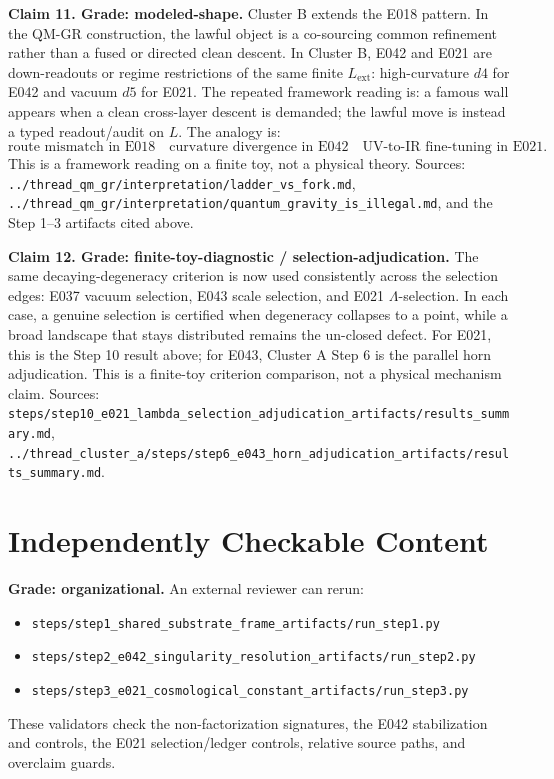 \documentclass[11pt]{article}
\begin{document}
\textbf{Claim 11. Grade: modeled-shape.}
Cluster B extends the E018 pattern. In the QM-GR construction, the lawful object is a co-sourcing common refinement rather than a fused or directed clean descent. In Cluster B, E042 and E021 are down-readouts or regime restrictions of the same finite \(L_{\mathrm{ext}}\): high-curvature \(d4\) for E042 and vacuum \(d5\) for E021. The repeated framework reading is: a famous wall appears when a clean cross-layer descent is demanded; the lawful move is instead a typed readout/audit on \(L\). The analogy is:
\[
\text{route mismatch in E018} \quad
\text{curvature divergence in E042} \quad
\text{UV-to-IR fine-tuning in E021}.
\]
This is a framework reading on a finite toy, not a physical theory.
Sources: \texttt{../thread\_qm\_gr/interpretation/ladder\_vs\_fork.md}, \texttt{../thread\_qm\_gr/interpretation/quantum\_gravity\_is\_illegal.md}, and the Step 1--3 artifacts cited above.

\textbf{Claim 12. Grade: finite-toy-diagnostic / selection-adjudication.}
The same decaying-degeneracy criterion is now used consistently across the selection edges: E037 vacuum selection, E043 scale selection, and E021 \(\Lambda\)-selection. In each case, a genuine selection is certified when degeneracy collapses to a point, while a broad landscape that stays distributed remains the un-closed defect. For E021, this is the Step 10 result above; for E043, Cluster A Step 6 is the parallel horn adjudication. This is a finite-toy criterion comparison, not a physical mechanism claim.
Sources: \texttt{steps/step10\_e021\_lambda\_selection\_adjudication\_artifacts/results\_summary.md}, \texttt{../thread\_cluster\_a/steps/step6\_e043\_horn\_adjudication\_artifacts/results\_summary.md}.

\section{Independently Checkable Content}

\textbf{Grade: organizational.}
An external reviewer can rerun:
\begin{itemize}
  \item \texttt{steps/step1\_shared\_substrate\_frame\_artifacts/run\_step1.py}
  \item \texttt{steps/step2\_e042\_singularity\_resolution\_artifacts/run\_step2.py}
  \item \texttt{steps/step3\_e021\_cosmological\_constant\_artifacts/run\_step3.py}
\end{itemize}
These validators check the non-factorization signatures, the E042 stabilization and controls, the E021 selection/ledger controls, relative source paths, and overclaim guards.
\end{document}
